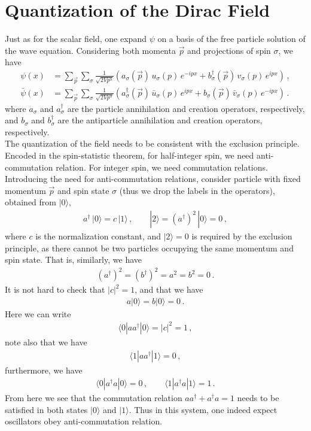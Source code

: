 \documentclass[11pt, onesided]{book}
\theoremstyle{break}
\theoremstyle{break}
\begin{document}
\section[Quantization of the Dirac Field]{\color{red} Quantization of the Dirac Field\color{black}}
Just as for the scalar field, one expand $\psi$ on a basis of the free particle solution of the wave equation. Considering both momenta $\vec{p}$ and projections of spin $\sigma$, we have
\begin{align*}
\psi(x) &= \sum_{\vec{p}}\sum_{\sigma} \frac{1}{\sqrt{2Vp^0}}\left(a_{\sigma}(\vec{p}) \, u_\sigma(p)\, e^{-ipx} + b_{\sigma}^\dagger(\vec{p}) \, v_\sigma(p)\, e^{ipx}\right)\,,\\
\bar{\psi}(x) &= \sum_{\vec{p}}\sum_{\sigma} \frac{1}{\sqrt{2Vp^0}}\left(a_{\sigma}^\dagger(\vec{p}) \, \bar{u}_\sigma(p)\, e^{ipx} + b_{\sigma}(\vec{p}) \, \bar{v}_\sigma(p)\, e^{-ipx}\right)\,.
\end{align*}
where $a_{\sigma}$ and $a_{\sigma}^\dagger$ are the particle annihilation and creation operators, respectively, and $b_\sigma$ and $b_\sigma^{\dagger}$ are the antiparticle annihilation and creation operators, respectively. \\

The quantization of the field needs to be consistent with the exclusion principle. Encoded in the spin-statistic theorem, for half-integer spin, we need anti-commutation relation. For integer spin, we need commutation relations. Introducing the need for anti-commutation relations, consider particle with fixed momentum $\vec{p}$ and spin state $\sigma$ (thus we drop the labels in the operators), obtained from $|0\rangle$,
\begin{align*}
a^\dagger \, |0\rangle = c\, |1\rangle\,,\qquad
|2\rangle = (a^\dagger)^2 \, |0\rangle = 0\,,
\end{align*}
where $c$ is the normalization constant, and $|2\rangle = 0$ is required by the exclusion principle, as there cannot be two particles occupying the same momentum and spin state. That is, similarly, we have
\begin{align*}
(a^\dagger)^2 = (b^\dagger)^2 = a^2 = b^2 = 0\,.
\end{align*}
It is not hard to check that $|c|^2 = 1$, and that we have
\begin{align*}
a|0\rangle = b|0\rangle = 0\,.
\end{align*}
Here we can write
\begin{align*}
\langle 0 |aa^\dagger|0 \rangle = |c|^2 = 1\,,
\end{align*}
note also that we have
\begin{align*}
\langle 1 | aa^\dagger | 1\rangle = 0\,,
\end{align*}
furthermore, we have
\begin{align*}
\langle 0|a^\dagger a|0\rangle = 0\,,\qquad
\langle 1|a^\dagger a|1\rangle = 1\,.
\end{align*}
From here we see that the commutation relation $aa^\dagger  + a^\dagger a = 1$ needs to be satisfied in both states $|0\rangle $ and $|1\rangle$. Thus in this system, one indeed expect oscillators obey anti-commutation relation. \\
\end{document}

